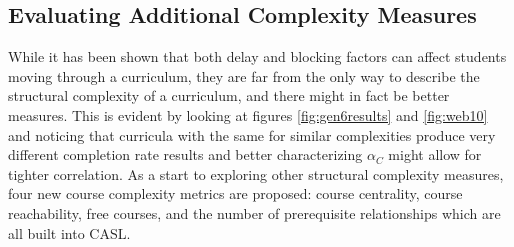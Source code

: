 \documentclass[botnum, fleqn]{unmeethesis}
\begin{document}



    \subsection{Evaluating Additional Complexity Measures}
      While it has been shown that both delay and blocking factors can affect students moving through a curriculum, they are far from the only way to describe the structural complexity of a curriculum, and there might in fact be better measures. This is evident by looking at figures \ref{fig:gen6results} and \ref{fig:web10} and noticing that curricula with the same for similar complexities produce very different completion rate results and better characterizing $\alpha_C$ might allow for tighter correlation. As a start to exploring other structural complexity measures, four new course complexity metrics are proposed: course centrality, course reachability, free courses, and the number of prerequisite relationships which are all built into CASL.
\end{document}

